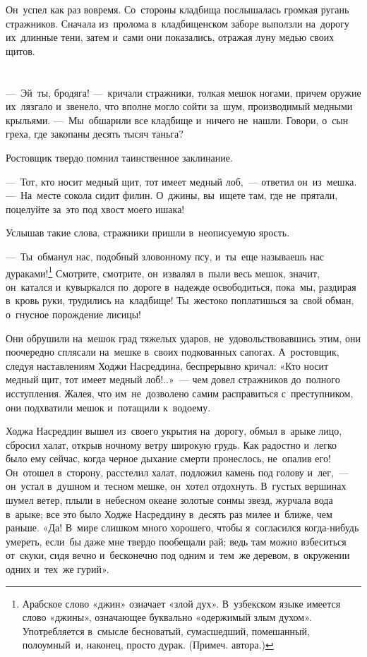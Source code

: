 \documentclass[12pt,a4paper]{book}
\begin{document}
Он~успел как раз вовремя. Со~стороны кладбища послышалась громкая ругань стражников. Сначала из~пролома в~кладбищенском заборе выползли на~дорогу их~длинные тени, затем и~сами они показались, отражая луну медью своих щитов.


\chapter{}

—~Эй~ты, бродяга! —~кричали стражники, толкая мешок ногами, причем оружие их~лязгало и~звенело, что вполне могло сойти за~шум, производимый медными крыльями. —~Мы~обшарили все кладбище и~ничего не~нашли. Говори, о~сын греха, где закопаны десять тысяч таньга?

Ростовщик твердо помнил таинственное заклинание.

—~Тот, кто носит медный щит, тот имеет медный лоб,~— ответил он~из~мешка. —~На~месте сокола сидит филин. О~джины, вы~ищете там, где не~прятали, поцелуйте за~это под хвост моего ишака!

Услышав такие слова, стражники пришли в~неописуемую ярость.

—~Ты~обманул нас, подобный зловонному псу, и~ты~еще называешь нас дураками!\footnote{Арабское слово «джин» означает «злой дух». В~узбекском языке имеется слово «джины», означающее буквально «одержимый злым духом». Употребляется в~смысле бесноватый, сумасшедший, помешанный, полоумный~и, наконец, просто дурак. (Примеч. автора.)} Смотрите, смотрите, он~извалял в~пыли весь мешок, значит, он~катался и~кувыркался по~дороге в~надежде освободиться, пока~мы, раздирая в~кровь руки, трудились на~кладбище! Ты~жестоко поплатишься за~свой обман, о~гнусное порождение лисицы!

Они обрушили на~мешок град тяжелых ударов, не~удовольствовавшись этим, они поочередно сплясали на~мешке в~своих подкованных сапогах. А~ростовщик, следуя наставлениям Ходжи Насреддина, беспрерывно кричал: «Кто носит медный щит, тот имеет медный лоб!..»~— чем довел стражников до~полного исступления. Жалея, что им~не~дозволено самим расправиться с~преступником, они подхватили мешок и~потащили к~водоему.

Ходжа Насреддин вышел из~своего укрытия на~дорогу, обмыл в~арыке лицо, сбросил халат, открыв ночному ветру широкую грудь. Как радостно и~легко было ему сейчас, когда черное дыхание смерти пронеслось, не~опалив его! Он~отошел в~сторону, расстелил халат, подложил камень под голову и~лег,~— он~устал в~душном и~тесном мешке, он~хотел отдохнуть. В~густых вершинах шумел ветер, плыли в~небесном океане золотые сонмы звезд, журчала вода в~арыке; все это было Ходже Насреддину в~десять раз милее и~ближе, чем раньше. «Да! В~мире слишком много хорошего, чтобы я~согласился когда-нибудь умереть, если~бы даже мне твердо пообещали рай; ведь там можно взбеситься от~скуки, сидя вечно и~бесконечно под одним и~тем~же деревом, в~окружении одних и~тех~же гурий».
\end{document}
